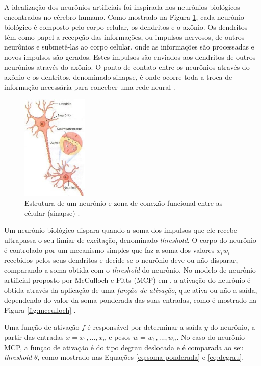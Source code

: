 A idealização dos neurônios artificiais foi inspirada nos neurônios biológicos encontrados no cérebro humano. Como mostrado na Figura \ref{fig:sinapse}, cada neurônio biológico é composto pelo corpo celular, os dendritos e o axônio. Os dendritos têm como papel a recepção das informações, ou impulsos nervosos, de outros neurônios e submetê-las ao corpo celular, onde as informações são processadas e novos impulsos são gerados. Estes impulsos são enviados aos dendritos de outros neurônios através do axônio. O ponto de contato entre os neurônios através do axônio e os dentritos, denominado sinapse, é onde ocorre toda a troca de informação necessária para conceber uma rede neural \cite{braga}.

\begin{figure}[H]
\centering
\includegraphics[height=5cm]{imgs/sinapse}
\caption{Estrutura de um neurônio e zona de conexão funcional entre as célular (sinapse) \cite{sinapse}.}
\label{fig:sinapse}
\end{figure}

Um neurônio biológico dispara quando a soma dos impulsos que ele recebe ultrapassa o seu limiar de excitação, denominado \emph{threshold}. O corpo do neurônio é controlado por um mecanismo simples que faz a soma dos valores $x_i w_i$ recebidos pelos seus dendritos e decide se o neurônio deve ou não disparar, comparando a soma obtida com o \emph{threshold} do neurônio. No modelo de neurônio artificial proposto por McCulloch e Pitts (MCP) em \cite{mcculloch}, a ativação do neurônio é obtida através da aplicação de uma \emph{função de ativação}, que ativa ou não a saída, dependendo do valor da soma ponderada das suas entradas, como é mostrado na Figura \ref{fig:mcculloch} \cite{braga}.


Uma função de ativação $f$ é responsável por determinar a saída $y$ do neurônio, a partir das entradas $x = x_1, ..., x_n$ e pesos $w = w_1, ..., w_n$. No caso do neurônio MCP, a funçao de ativação é do tipo degrau deslocada e é comparada ao seu \emph{threshold} $\theta$, como mostrado nas Equações \ref{eq:soma-ponderada} e \ref{eq:degrau}.

